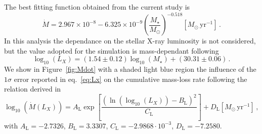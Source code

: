 \documentclass{aa}
\begin{document}
The best fitting function obtained from the current study is
\begin{equation}
  \dot{M} = 2.967\times10^{-8} - 6.325\times10^{-9} \left(\frac{M_\star}{M_\odot}\right)^{-0.518} [M_\odot\, \mathrm{yr}^{-1}]\,.
\end{equation}
In this analysis the dependance on the stellar X-ray luminosity is not considered, but the value adopted for the simulation is mass-dependant following 
\begin{equation}\label{eq:Lx}
	\log_{10}{(L_X)} = (1.54 \pm 0.12) \log_{10}{(M_\star)} + (30.31 \pm 0.06)\,.
\end{equation}
We show in Figure~\ref{fig:Mdot} with a shaded light blue region the influence of the $1 \sigma$ error reported in eq.~\ref{eq:Lx} on the cumulative mass-loss rate following the relation derived in 
\begin{equation}\label{eq:MdotLx}
  \log_{10}(\dot{M}(L_X)) = A_\textrm{L} \exp{\left[\frac{(\ln{(\log_{10}(L_X))}-B_\textrm{L})^2}{C_\textrm{L}}\right]} + D_\textrm{L} [M_\odot\, \mathrm{yr}^{-1}]\,,
\end{equation}
with $A_\textrm{L} = -2.7326$, $B_\textrm{L} = 3.3307$, $C_\textrm{L} = -2.9868\cdot10^{-3}$, $D_\textrm{L} = -7.2580$.
\end{document}
